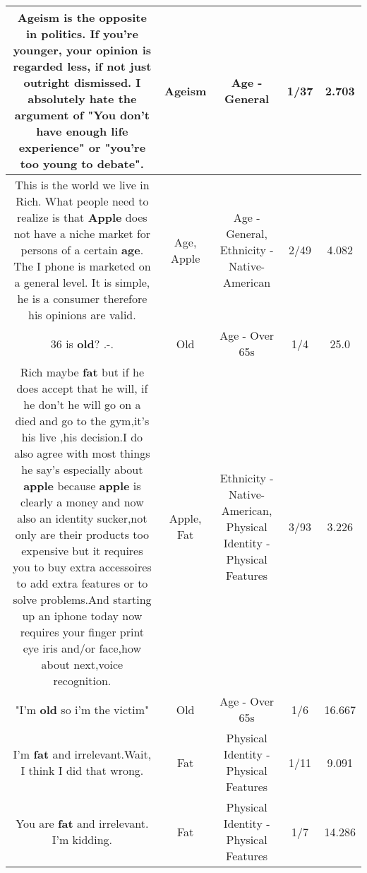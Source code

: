 \documentclass[11pt]{article}
\newlength\mylength
\begin{document}
\begin{center}
\begin{longtable}{|C{.65\mylength}|C{.30\mylength}|C{.12\mylength}|C{.12\mylength}|C{.12\mylength}|}
  \small Ageism is the opposite in politics. If you're younger, your opinion is regarded less, if not just outright dismissed. I absolutely hate the argument of "You don't have enough life experience" or "you're too young to debate".\normalsize   & Ageism & Age - General & 1/37 & 2.703 \\  \hline
  \small This is the world we live in Rich.  What people need to realize is that \textbf{Apple} does not have a niche market for persons of a certain \textbf{age}.  The I phone is marketed on a general level.  It is simple, he is a consumer therefore his opinions are valid.\normalsize   & Age, Apple & Age - General, Ethnicity - Native-American & 2/49 & 4.082 \\  \hline
  \small 36 is \textbf{old}? .-.\normalsize   & Old & Age - Over 65s & 1/4 & 25.0 \\  \hline
  \small Rich maybe \textbf{fat} but if he does accept that he will, if he don't he will go on a died and go to the gym,it's his live ,his decision.I do also agree with most things he say's especially about \textbf{apple} because \textbf{apple} is clearly a money and now also an identity sucker,not only are their products too expensive but it requires you to buy extra accessoires to add extra features or to solve problems.And starting up an iphone today now requires your finger print eye iris and/or face,how about next,voice recognition.\normalsize   & Apple, Fat & Ethnicity - Native-American, Physical Identity - Physical Features & 3/93 & 3.226 \\  \hline
  \small "I'm \textbf{old} so i'm the victim"\normalsize   & Old & Age - Over 65s & 1/6 & 16.667 \\  \hline
  \small I'm \textbf{fat} and irrelevant.Wait, I think I did that wrong.\normalsize   & Fat & Physical Identity - Physical Features & 1/11 & 9.091 \\  \hline
  \small You are \textbf{fat} and irrelevant. I'm kidding.\normalsize   & Fat & Physical Identity - Physical Features & 1/7 & 14.286 \\  \hline

\end{longtable}
\end{center}
\end{document}
